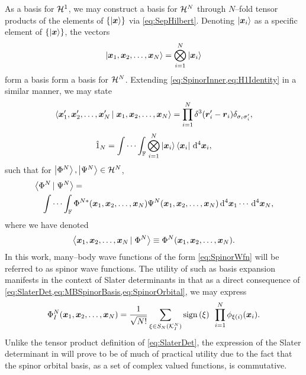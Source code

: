 As a basis for $\mathcal{H}^1$, we may construct a basis for $\mathcal{H}^N$ through $N$--fold tensor products 
of the elements of $\left \lbrace \left\vert \boldsymbol{x} \right\rangle \right\rbrace$ via \cref{eq:SepHilbert}. Denoting $\left\vert \boldsymbol{x}_i \right\rangle$ as
a specific element of $\left \lbrace \left\vert \boldsymbol{x} \right\rangle \right\rbrace$, the vectors
\begin{equation}
  \label{eq:MBSpinorBasis}
  \left\vert \boldsymbol{x}_1,\boldsymbol{x}_2,\ldots,\boldsymbol{x}_N \right\rangle = \bigotimes_{i = 1}^N \left\vert \boldsymbol{x}_i \right\rangle
\end{equation}
form a basis form a basis for $\mathcal{H}^N$. Extending \cref{eq:SpinorInner,eq:H1Identity} in a similar manner, we may state
\begin{equation}
  \left\langle \boldsymbol{x}'_1,\boldsymbol{x}'_2,\ldots,\boldsymbol{x}'_N \left\vert\right. \boldsymbol{x}_1,\boldsymbol{x}_2,\ldots,\boldsymbol{x}_N \right\rangle = \prod_{i=1}^N \delta^3(\boldsymbol{r}'_i - \boldsymbol{r}_i)\delta_{\sigma_i\sigma'_i},
\end{equation}
\begin{equation}
  \hat{1}_N = \idotsint_{\mathbb F} \bigotimes_{i=1}^N \left\vert \boldsymbol{x}_i \right\rangle \left\langle \boldsymbol{x}_i \right\vert \,\mathrm{d}^4\boldsymbol{x}_i,
\end{equation}
such that for $\left\vert \Phi^N \right\rangle,\left\vert \Psi^N \right\rangle \in \mathcal{H}^N$,
\begin{align}
&\left\langle \Phi^N \left\vert\right. \Psi^N \right\rangle = \nonumber \\&\quad \idotsint_{\mathbb F} 
  \Phi^{N*}(\boldsymbol{x}_1,\boldsymbol{x}_2,\ldots,\boldsymbol{x}_N) \Psi^{N}(\boldsymbol{x}_1,\boldsymbol{x}_2,\ldots,\boldsymbol{x}_N) \,\mathrm{d}^4\boldsymbol{x}_1 \cdots \,\mathrm{d}^4\boldsymbol{x}_N,
\end{align}
where we have denoted
\begin{equation}
  \label{eq:SpinorWfn}
  \left\langle \boldsymbol{x}_1,\boldsymbol{x}_2,\ldots,\boldsymbol{x}_N \left\vert\right. \Phi^N \right\rangle \equiv \Phi^N(\boldsymbol{x}_1,\boldsymbol{x}_2,\ldots,\boldsymbol{x}_N).
\end{equation}
In this work, many--body wave functions of the form \cref{eq:SpinorWfn} will be referred to as spinor wave functions.
The utility of such as basis expansion manifests in the context of Slater determinants in that as
a direct consequence of \cref{eq:SlaterDet,eq:MBSpinorBasis,eq:SpinorOrbital}, we may express
\begin{equation}
  \label{eq:SlaterDetSpace}
  \Phi_I^N(\boldsymbol{x}_1,\boldsymbol{x}_2,\ldots,\boldsymbol{x}_N) = \frac{1}{\sqrt{N!}} \sum_{\xi \in S_N(\mathcal{K}^N_I)} \mathrm{sign}\left( \xi \right) \text{ } 
    \prod_{i = 1 }^N \phi_{\xi(i)}(\boldsymbol{x}_i).
\end{equation}
Unlike the tensor product definition of \cref{eq:SlaterDet}, the expression of the Slater determinant in will prove to be of 
much of practical utility due to the fact that the spinor orbital basis, as a set of complex valued functions, is commutative.

